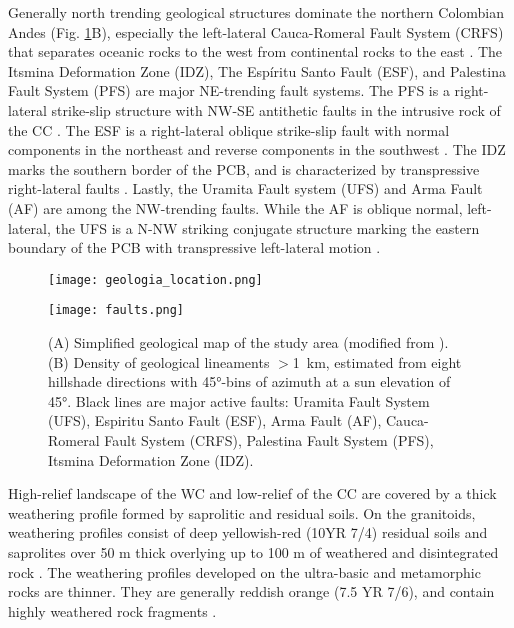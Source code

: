 \documentclass[draft]{agujournal2019}
\begin{document}
\par Generally north trending geological structures dominate the northern Colombian Andes (Fig. \ref{fig:geologia}B), especially the left-lateral Cauca-Romeral Fault System (CRFS) that separates oceanic rocks to the west from continental rocks to the east \cite{Egholm2013, ego1995}. The Itsmina Deformation Zone (IDZ), The Espíritu Santo Fault (ESF), and Palestina Fault System (PFS) are major NE-trending fault systems. The PFS is a right-lateral strike-slip structure with NW-SE antithetic faults in the intrusive rock of the CC \cite{acosta2007, feininger1970}. The ESF is a right-lateral oblique strike-slip fault with normal components in the northeast and reverse components in the southwest \cite{Noriega2020, page1986}. The IDZ marks the southern border of the PCB, and is characterized by transpressive right-lateral faults \cite{acosta2007, Taboada2000}. Lastly, the Uramita Fault system (UFS) and Arma Fault (AF) are among the NW-trending faults. While the AF is oblique normal, left-lateral, the UFS is a N-NW striking conjugate structure marking the eastern boundary of the PCB with transpressive left-lateral motion \cite{acosta2007, Taboada2000}.

\begin{figure}[ht!]
  \begin{minipage}{.48\linewidth}
    \centering
      {\texttt{[image: geologia\_location.png]}}
  \end{minipage}\quad
  \begin{minipage}{.48\linewidth}
    \centering
      {\texttt{[image: faults.png]}}
  \end{minipage}
    \caption{(A) Simplified geological map of the study area (modified from ). (B) Density of geological lineaments $>$1~km, estimated from eight hillshade directions with 45°-bins of azimuth at a sun elevation of 45°. Black lines are major active faults: Uramita Fault System (UFS), Espiritu Santo Fault (ESF), Arma Fault (AF), Cauca-Romeral Fault System (CRFS), Palestina Fault System (PFS), Itsmina Deformation Zone (IDZ).}
    \label{fig:geologia}
\end{figure}

\par High-relief landscape of the WC and low-relief of the CC are covered by a thick weathering profile formed by saprolitic and residual soils. On the granitoids, weathering profiles consist of deep yellowish-red (10YR 7/4) residual soils and saprolites over 50 m thick overlying up to 100 m of weathered and disintegrated rock \cite{aristizabal2005tropical}. The weathering profiles developed on the ultra-basic and metamorphic rocks are thinner. They are generally reddish orange (7.5 YR 7/6), and contain highly weathered rock fragments \cite{aristizabal2005tropical}.
\end{document}
